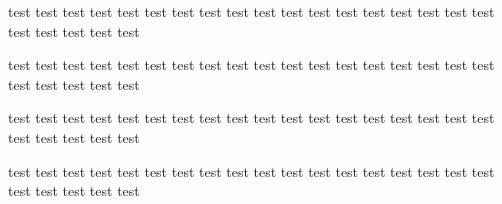 ﻿\documentclass{ctexart}
\begin{document}
    {\setlength{\fboxsep}{0pt}
    \fbox{\parbox{2em}{\rule{2pt}{2em}}}
    }
    
    test\vspace{2em} test test test test test test test test test test test test test test test test test test test test test test 

    test test test test test test test test test test test test test test test test test test test test test test test\vspace{2em} 

    test test test test test test test test test test test test test test test test test test test test test test test

    \vspace{2em}test test test test test test test test test test test test test test test test test test test test test test test
\end{document}
